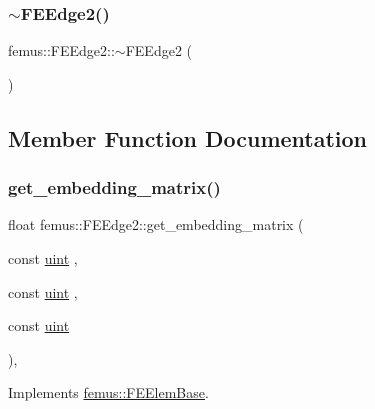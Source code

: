 \subsubsection{\texorpdfstring{$\sim$\+F\+E\+Edge2()}{~FEEdge2()}}
{\footnotesize\ttfamily femus\+::\+F\+E\+Edge2\+::$\sim$\+F\+E\+Edge2 (\begin{DoxyParamCaption}{ }\end{DoxyParamCaption})}



\subsection{Member Function Documentation}
\mbox{\label{classfemus_1_1_f_e_edge2_ab8a267a26f4930b636d6c5c14d2280dc}} 
\subsubsection{\texorpdfstring{get\+\_\+embedding\+\_\+matrix()}{get\_embedding\_matrix()}}
{\footnotesize\ttfamily float femus\+::\+F\+E\+Edge2\+::get\+\_\+embedding\+\_\+matrix (\begin{DoxyParamCaption}\item[{const \mbox{\hyperlink{_typedefs_8hpp_a91ad9478d81a7aaf2593e8d9c3d06a14}{uint}}}]{,  }\item[{const \mbox{\hyperlink{_typedefs_8hpp_a91ad9478d81a7aaf2593e8d9c3d06a14}{uint}}}]{,  }\item[{const \mbox{\hyperlink{_typedefs_8hpp_a91ad9478d81a7aaf2593e8d9c3d06a14}{uint}}}]{ }\end{DoxyParamCaption})\hspace{0.3cm}{\ttfamily [inline]}, {\ttfamily [virtual]}}



Implements \mbox{\hyperlink{classfemus_1_1_f_e_elem_base_a0c4d6d5ec66bd4e301eb8ea2ef10f354}{femus\+::\+F\+E\+Elem\+Base}}.

\mbox{\label{classfemus_1_1_f_e_edge2_a11dc956a09fc9775f474d388eab1de21}} 
